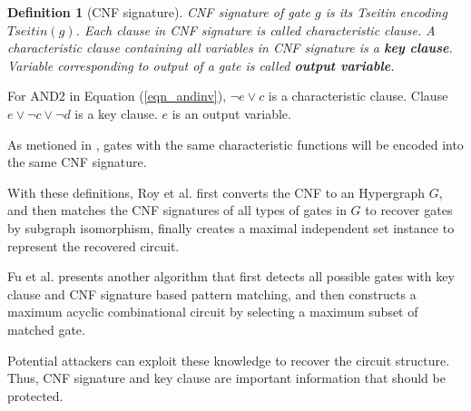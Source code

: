 \documentclass[conference,compsocconf]{IEEEtran}
\newtheorem{definition}{\textbf{Definition}}
\begin{document}
\begin{definition}[CNF signature]
CNF signature of gate $g$ is its Tseitin encoding $Tseitin(g)$.
Each clause in CNF signature is called characteristic clause.
A characteristic clause containing all variables in CNF signature is a \textbf{key clause}.
Variable corresponding to output of a gate is called \textbf{output variable}.
\end{definition}

For AND2 in Equation (\ref{eqn_andinv}), 
$\neg e\vee c$ is a characteristic clause.
Clause $e\vee \neg c\vee\neg d$ is a key clause.
$e$ is an output variable.

As metioned in \cite{csRoy}, 
gates with the same characteristic functions will be encoded into the same CNF signature.

% 
With these definitions, 
Roy et al. \cite{csRoy}
first converts the CNF to an Hypergraph $G$, 
and then matches the CNF signatures of all types of gates in $G$ to recover gates by subgraph isomorphism, 
finally creates a maximal independent set instance to represent the recovered circuit.

Fu et al.\cite{csFu} presents another algorithm that
first detects all possible gates with key clause and CNF signature based pattern matching, 
and then constructs a maximum acyclic combinational circuit by selecting a maximum subset of matched gate.

Potential attackers can exploit these knowledge to recover the circuit structure.
Thus, CNF signature and key clause are important information that should be protected.
\end{document}
